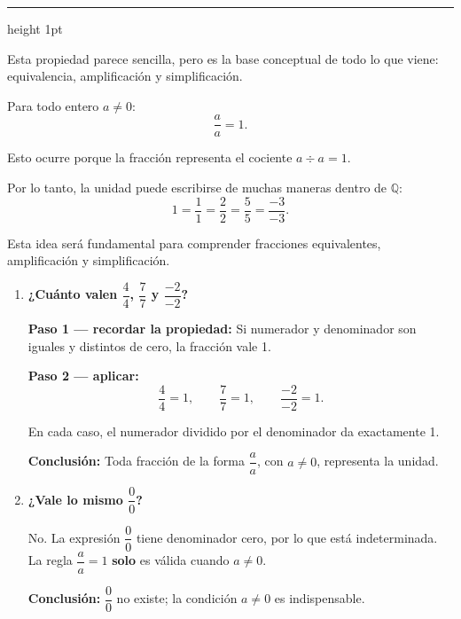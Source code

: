\documentclass[11pt, letterpaper]{article}
\newcommand{\subbloque}[1]{%
  \vspace{14pt}
  \noindent{\large\bfseries\color{zenitnavy} #1}\par
  \vspace{4pt}\hrule height 1pt\vspace{8pt}}
\begin{document}
\subbloque{1.3 La unidad en $\mathbb{Q}$: $\dfrac{a}{a}=1$}
\label{sub:1.3}

Esta propiedad parece sencilla, pero es la base conceptual de todo lo que viene: equivalencia, amplificaci\'on y simplificaci\'on.

\begin{tcolorbox}[importantbox, title={La unidad escrita como fracci\'on}]
Para todo entero $a\neq 0$:
$$\frac{a}{a}=1.$$

Esto ocurre porque la fracci\'on representa el cociente $a\div a=1$.

Por lo tanto, la unidad puede escribirse de muchas maneras dentro de $\mathbb{Q}$:
$$1=\frac{1}{1}=\frac{2}{2}=\frac{5}{5}=\frac{-3}{-3}.$$

Esta idea ser\'a fundamental para comprender fracciones equivalentes, amplificaci\'on y simplificaci\'on.
\end{tcolorbox}

\begin{tcolorbox}[examplebox, title={Ejemplos --- Fracciones que valen 1}]
\begin{enumerate}[label=\textbf{Ej. \arabic*.}, leftmargin=*, itemsep=14pt]

\item \textbf{¿Cuánto valen $\dfrac{4}{4}$, $\dfrac{7}{7}$ y $\dfrac{-2}{-2}$?}

\textbf{Paso 1 --- recordar la propiedad:}
Si numerador y denominador son iguales y distintos de cero, la fracci\'on vale 1.

\medskip
\textbf{Paso 2 --- aplicar:}
$$\frac{4}{4}=1, \qquad \frac{7}{7}=1, \qquad \frac{-2}{-2}=1.$$

En cada caso, el numerador dividido por el denominador da exactamente 1.

\medskip
\textbf{Conclusi\'on:}
Toda fracci\'on de la forma $\dfrac{a}{a}$, con $a\neq 0$, representa la unidad.

\item \textbf{¿Vale lo mismo $\dfrac{0}{0}$?}

No. La expresi\'on $\dfrac{0}{0}$ tiene denominador cero, por lo que est\'a indeterminada. La regla $\dfrac{a}{a}=1$ \textbf{solo} es v\'alida cuando $a\neq 0$.

\medskip
\textbf{Conclusi\'on:}
$\dfrac{0}{0}$ no existe; la condici\'on $a\neq 0$ es indispensable.

\end{enumerate}
\end{tcolorbox}
\end{document}
